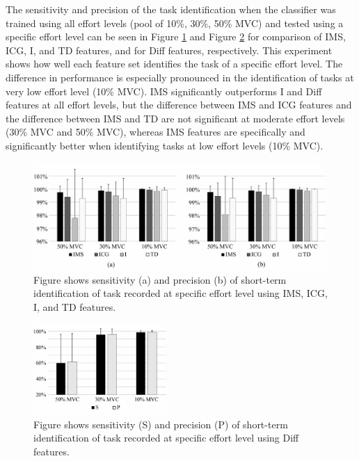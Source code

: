 The sensitivity and precision of the task identification when the classifier was trained using all effort levels (pool of 10\%, 30\%, 50\% MVC) and tested using a specific effort level can be seen in Figure \ref{fig:3-8} and Figure \ref{fig:3-9} for comparison of IMS, ICG, I, and TD features, and for Diff features, respectively. This experiment shows how well each feature set identifies the task of a specific effort level. The difference in performance is especially pronounced in the identification of tasks at very low effort level (10\% MVC). IMS significantly outperforms I and Diff features at all effort levels, but the difference between IMS and ICG features and the difference between IMS and TD are not significant at moderate effort levels (30\% MVC and 50\% MVC), whereas IMS features are specifically and significantly better when identifying tasks at low effort levels (10\% MVC).

\begin{figure}[ht]
\centering
\includegraphics[width=0.99\textwidth]{Images/figure3_8.png}
\caption{Figure shows sensitivity (a) and precision (b) of short-term identification of task recorded at specific effort level using IMS, ICG, I, and TD features.}
\label{fig:3-8}
\end{figure}   

\begin{figure}[ht]
\centering
\includegraphics[width=0.45\textwidth]{Images/figure3_9.png}
\caption{Figure shows sensitivity (S) and precision (P) of short-term identification of task recorded at specific effort level using Diff features.}
\label{fig:3-9}
\end{figure}   

